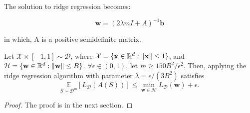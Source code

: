 The solution to ridge regression becomes:

\begin{equation}
	\mathbf{w} = {(2\lambda m I + A)}^{-1} \mathbf{b}
\end{equation}

in which, A is a positive semidefinite matrix.

\begin{thm}
	\label{thm_13_1}
	Let $ \mathcal{X}\times [-1,1] \sim \mathcal{D} $, 
	where $ \mathcal{X} = \{ \mathbf{x} \in \mathbb{R}^d : \Arrowvert \mathbf{x} \Arrowvert \le 1 \} $, 
	and $ \mathcal{H} = \{ \mathbf{w} \in \mathbb{R}^d : \Arrowvert \mathbf{w} \Arrowvert \le B \} $.
	$ \forall \epsilon \in (0,1) $, let $ m \ge 150B^2/\epsilon^2 $. Then, applying the ridge regression algorithm
	with parameter $ \lambda = \epsilon/(3B^2) $ satisfies
	\[ \underset{S\sim\mathcal{D}^m} {\mathbb{E}} [L_\mathcal{D}(A(S))] 
	\le \min\limits_{\mathbf{w}\in\mathcal{H}}L_\mathcal{D}(\mathbf{w}) + \epsilon.\]
	\begin{proof}
		The proof is in the next section.
	\end{proof}
\end{thm}

